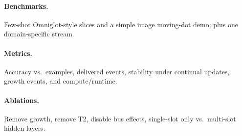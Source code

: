 \paragraph{Benchmarks.} Few-shot Omniglot-style slices and a simple image moving-dot demo; plus one domain-specific stream.

\paragraph{Metrics.} Accuracy vs.\ examples, delivered events, stability under continual updates, growth events, and compute/runtime.

\paragraph{Ablations.} Remove growth, remove T2, disable bus effects, single-slot only vs.\ multi-slot hidden layers.